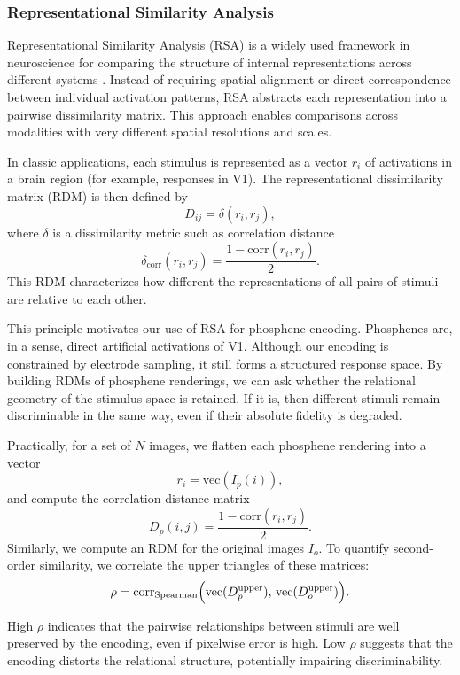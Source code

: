 \subsubsection{Representational Similarity Analysis}
Representational Similarity Analysis (RSA) is a widely used framework in neuroscience for comparing the structure of internal representations across different systems \cite{Kriegeskorte2008}. Instead of requiring spatial alignment or direct correspondence between individual activation patterns, RSA abstracts each representation into a pairwise dissimilarity matrix. This approach enables comparisons across modalities with very different spatial resolutions and scales.

In classic applications, each stimulus is represented as a vector \(r_i\) of activations in a brain region (for example, responses in V1). The representational dissimilarity matrix (RDM) is then defined by
\[
D_{ij} = \delta(r_i, r_j),
\]
where \(\delta\) is a dissimilarity metric such as correlation distance
\[
\delta_{\mathrm{corr}}(r_i, r_j) = \frac{1 - \mathrm{corr}(r_i, r_j)}{2}.
\]
This RDM characterizes how different the representations of all pairs of stimuli are relative to each other.

This principle motivates our use of RSA for phosphene encoding. Phosphenes are, in a sense, direct artificial activations of V1. Although our encoding is constrained by electrode sampling, it still forms a structured response space. By building RDMs of phosphene renderings, we can ask whether the relational geometry of the stimulus space is retained. If it is, then different stimuli remain discriminable in the same way, even if their absolute fidelity is degraded.

Practically, for a set of \(N\) images, we flatten each phosphene rendering into a vector
\[
r_i = \mathrm{vec}(I_p(i)),
\]
and compute the correlation distance matrix
\[
D_p(i,j) = \frac{1 - \mathrm{corr}(r_i, r_j)}{2}.
\]
Similarly, we compute an RDM for the original images \(I_o\). To quantify second-order similarity, we correlate the upper triangles of these matrices:
\[
\rho = \mathrm{corr}_{\mathrm{Spearman}}\Bigl(\mathrm{vec}(D_p^{\mathrm{upper}}), \,\mathrm{vec}(D_o^{\mathrm{upper}})\Bigr).
\]

High \(\rho\) indicates that the pairwise relationships between stimuli are well preserved by the encoding, even if pixelwise error is high. Low \(\rho\) suggests that the encoding distorts the relational structure, potentially impairing discriminability.

